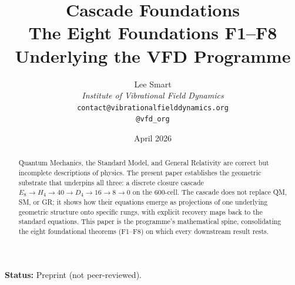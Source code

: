 \documentclass[12pt]{article}
\title{Cascade Foundations\\[6pt]
\large The Eight Foundations F1--F8 Underlying the VFD Programme}
\author{%
  Lee Smart\\[4pt]
  \textit{Institute of Vibrational Field Dynamics}\\[2pt]
  \texttt{contact@vibrationalfielddynamics.org}\\[2pt]
  \texttt{@vfd\_org}%
}
\date{April 2026}
\theoremstyle{definition}
\theoremstyle{remark}
\begin{document}
\maketitle

\noindent\textbf{Status:} Preprint (not peer-reviewed).

\begin{abstract}
Quantum Mechanics, the Standard Model, and General Relativity are correct but incomplete descriptions of physics. The present paper establishes the geometric substrate that underpins all three: a discrete closure cascade $E_8 \to H_4 \to 40 \to D_4 \to 16 \to 8 \to 0$ on the 600-cell. The cascade does not replace QM, SM, or GR; it shows how their equations emerge as projections of one underlying geometric structure onto specific rungs, with explicit recovery maps back to the standard equations. This paper is the programme's mathematical spine, consolidating the eight foundational theorems (F1--F8) on which every downstream result rests.


\end{abstract}
\end{document}
